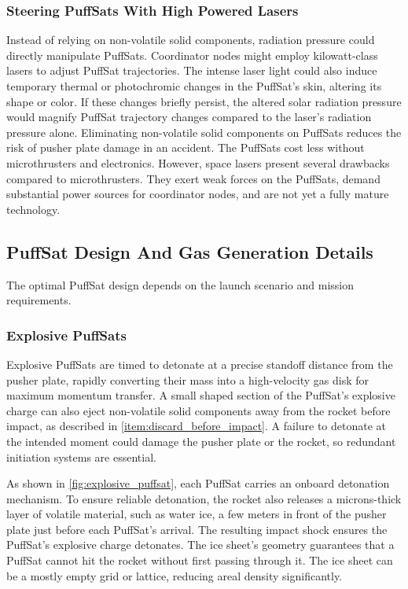 \documentclass{article}
\begin{document}
\subsubsection{Steering PuffSats With High Powered Lasers}
Instead of relying on non-volatile solid components, radiation pressure could directly manipulate PuffSats. Coordinator nodes might employ kilowatt-class lasers to adjust PuffSat trajectories. The intense laser light could also induce temporary thermal or photochromic changes in the PuffSat's skin, altering its shape or color. If these changes briefly persist, the altered solar radiation pressure would magnify PuffSat trajectory changes compared to the laser's radiation pressure alone. Eliminating non-volatile solid components on PuffSats  reduces the risk of pusher plate damage in an accident.  The PuffSats cost less without microthrusters and electronics. However, space lasers present several drawbacks compared to microthrusters. They exert weak forces on the PuffSats, demand substantial power sources for coordinator nodes, and are not yet a fully mature technology. 

\subsection{PuffSat Design And Gas Generation Details}\label{sec:puffsat_design}
The optimal PuffSat design depends on the launch scenario and mission requirements.  
\subsubsection{Explosive PuffSats} \label{sec:explosive_puffsat}
Explosive PuffSats are timed to detonate at a precise standoff distance from the pusher plate, rapidly converting their mass into a high-velocity gas disk for maximum momentum transfer. A small shaped section of the PuffSat's explosive charge can also eject non-volatile solid components away from the rocket before impact, as described in \autoref{item:discard_before_impact}.  A failure to detonate at the intended moment could damage the pusher plate or the rocket, so redundant initiation systems are essential.

As shown in \autoref{fig:explosive_puffsat}, each PuffSat carries an onboard detonation mechanism. To ensure reliable detonation, the rocket also releases a microns-thick layer of volatile material, such as water ice, a few meters in front of the pusher plate just before each PuffSat's arrival. The resulting impact shock ensures the PuffSat’s explosive charge detonates. The ice sheet’s geometry guarantees that a PuffSat cannot hit the rocket without first passing through it.  The ice sheet can be a mostly empty grid or lattice, reducing areal density significantly.
\end{document}
